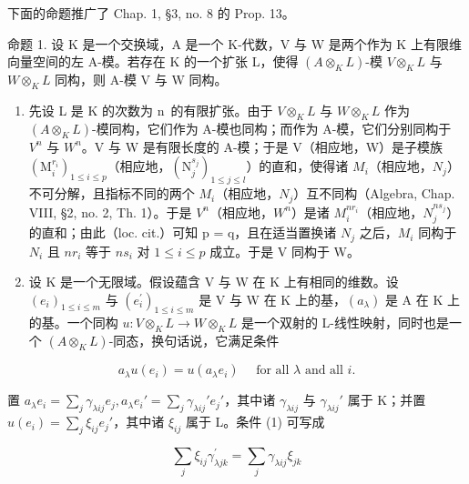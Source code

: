 
下面的命题推广了 Chap. 1, §3, no. 8 的 Prop. 13。

命题 1. 设 K 是一个交换域，A 是一个 K-代数，V 与 W 是两个作为 K 上有限维向量空间的左 A-模。若存在 K 的一个扩张 L，使得 \((A \otimes_{K} L)\)-模 \(V \otimes_{K} L\) 与 \(W \otimes_{K} L\) 同构，则 A-模 V 与 W 同构。

\begin{enumerate}
\def\labelenumi{\alph{enumi})}
\item
  先设 L 是 K 的次数为 n~的有限扩张。由于 \(V \otimes_{K} L\) 与 \(W \otimes_{K} L\) 作为 \((A \otimes_{K} L)\)-模同构，它们作为 A-模也同构；而作为 A-模，它们分别同构于 \(V^{n}\) 与 \(W^{n}\)。V 与 W 是有限长度的 A-模；于是 V（相应地，W）是子模族 \((\mathrm{M}_{i}^{r_{i}})_{1 \leqslant i \leqslant p}\)（相应地，\((\mathrm{N}_{j}^{s_{j}})_{1 \leqslant j \leqslant l}\)）的直和，使得诸 \(M_{i}\)（相应地，\(N_{j}\)）不可分解，且指标不同的两个 \(M_{i}\)（相应地，\(N_{j}\)）互不同构（Algebra, Chap. VIII, §2, no. 2, Th. 1）。于是 \(V^{n}\)（相应地，\(W^{n}\)）是诸 \(M_{i}^{nr_{i}}\)（相应地，\(N_{j}^{ns_{j}}\)）的直和；由此（loc. cit.）可知 p = q，且在适当置换诸 \(N_{j}\) 之后，\(M_{i}\) 同构于 \(N_{i}\) 且 \(nr_{i}\) 等于 \(ns_{i}\) 对 \(1 \leqslant i \leqslant p\) 成立。于是 V 同构于 W。
\item
  设 K 是一个无限域。假设蕴含 V 与 W 在 K 上有相同的维数。设 \((e_{i})_{1\leqslant i\leqslant m}\) 与 \((e_{i}^{\prime})_{1\leqslant i\leqslant m}\) 是 V 与 W 在 K 上的基，\((a_{\lambda})\) 是 A 在 K 上的基。一个同构 \(u:V\otimes_{K}L\to W\otimes_{K}L\) 是一个双射的 L-线性映射，同时也是一个 \((A\otimes_{K}L)\)-同态，换句话说，它满足条件
\end{enumerate}

\[
a _ {\lambda} u \left(e _ {i}\right) = u \left(a _ {\lambda} e _ {i}\right) \quad \text { for   all } \lambda \text { and   all } i.\tag{1}
\]

置 \(a_{\lambda}e_{i} = \sum_{j}\gamma_{\lambda ij}e_{j}, a_{\lambda}e_{i}' = \sum_{j}\gamma_{\lambda ij}'e_{j}'\)，其中诸 \(\gamma_{\lambda ij}\) 与 \(\gamma_{\lambda ij}'\) 属于 K；并置 \(u(e_i) = \sum_{j}\xi_{ij}e_j'\)，其中诸 \(\xi_{ij}\) 属于 L。条件 (1) 可写成

\[
\sum_ {j} \xi_ {i j} \gamma_ {\lambda j k} ^ {\prime} = \sum_ {j} \gamma_ {\lambda i j} \xi_ {j k}\tag{2}
\]

